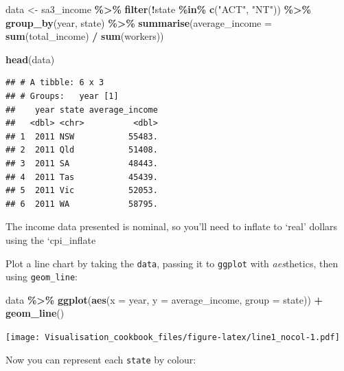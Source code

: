 \documentclass[
]{book}
\newenvironment{Shaded}{\begin{snugshade}}{\end{snugshade}}
\newcommand{\DataTypeTok}[1]{\textcolor[rgb]{0.13,0.29,0.53}{#1}}
\newcommand{\KeywordTok}[1]{\textcolor[rgb]{0.13,0.29,0.53}{\textbf{#1}}}
\newcommand{\NormalTok}[1]{#1}
\newcommand{\OperatorTok}[1]{\textcolor[rgb]{0.81,0.36,0.00}{\textbf{#1}}}
\newcommand{\StringTok}[1]{\textcolor[rgb]{0.31,0.60,0.02}{#1}}
\begin{document}
\begin{Shaded}
\begin{Highlighting}[]
\NormalTok{data \textless{}{-}}\StringTok{ }\NormalTok{sa3\_income }\OperatorTok{\%\textgreater{}\%}\StringTok{ }
\StringTok{  }\KeywordTok{filter}\NormalTok{(}\OperatorTok{!}\NormalTok{state }\OperatorTok{\%in\%}\StringTok{ }\KeywordTok{c}\NormalTok{(}\StringTok{"ACT"}\NormalTok{, }\StringTok{"NT"}\NormalTok{)) }\OperatorTok{\%\textgreater{}\%}\StringTok{ }
\StringTok{  }\KeywordTok{group\_by}\NormalTok{(year, state) }\OperatorTok{\%\textgreater{}\%}\StringTok{ }
\StringTok{  }\KeywordTok{summarise}\NormalTok{(}\DataTypeTok{average\_income =} \KeywordTok{sum}\NormalTok{(total\_income) }\OperatorTok{/}\StringTok{ }\KeywordTok{sum}\NormalTok{(workers))}

\KeywordTok{head}\NormalTok{(data)}
\end{Highlighting}
\end{Shaded}

\begin{verbatim}
## # A tibble: 6 x 3
## # Groups:   year [1]
##    year state average_income
##   <dbl> <chr>          <dbl>
## 1  2011 NSW           55483.
## 2  2011 Qld           51408.
## 3  2011 SA            48443.
## 4  2011 Tas           45439.
## 5  2011 Vic           52053.
## 6  2011 WA            58795.
\end{verbatim}

The income data presented is nominal, so you'll need to inflate to `real' dollars using the `cpi\_inflate

Plot a line chart by taking the \texttt{data}, passing it to \texttt{ggplot} with \emph{aes}thetics, then using \texttt{geom\_line}:

\begin{Shaded}
\begin{Highlighting}[]
\NormalTok{data }\OperatorTok{\%\textgreater{}\%}\StringTok{ }
\StringTok{  }\KeywordTok{ggplot}\NormalTok{(}\KeywordTok{aes}\NormalTok{(}\DataTypeTok{x =}\NormalTok{ year,}
             \DataTypeTok{y =}\NormalTok{ average\_income,}
             \DataTypeTok{group =}\NormalTok{ state)) }\OperatorTok{+}\StringTok{ }
\StringTok{  }\KeywordTok{geom\_line}\NormalTok{()}
\end{Highlighting}
\end{Shaded}

\texttt{[image: Visualisation\_cookbook\_files/figure-latex/line1\_nocol-1.pdf]}

Now you can represent each \texttt{state} by colour:
\end{document}
